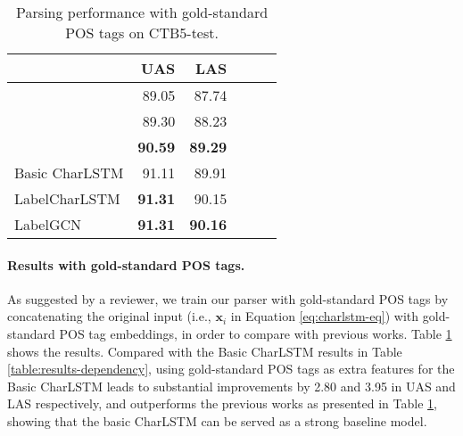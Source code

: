 \begin{table}[t]
\setlength{\tabcolsep}{2.5pt}
\centering
\begin{tabular}{lrrrrr}
    \toprule
    &  UAS & LAS \\
    \hline
   \citet{ma-2017-neural} &89.05 &87.74 \\
   \citet{dozat2016deep} &89.30 &88.23 \\
   \citet{acl18-ma-stackpointer} &\textbf{90.59}&\textbf{89.29}\\
    \hline
    Basic CharLSTM &91.11 &89.91  \\
    LabelCharLSTM    &\textbf{91.31} &90.15 \\
    LabelGCN       &\textbf{91.31}  &\textbf{90.16} \\
    \bottomrule
\end{tabular}
    \caption{Parsing performance with gold-standard POS tags on CTB5-test.}
    \label{table:results-dependency-goldpos}
\end{table}


\paragraph{Results with gold-standard POS tags.} As suggested by a reviewer, we train our parser with gold-standard POS tags by concatenating the original input (i.e., $\mathbf{x}_{i}$ in Equation \ref{eq:charlstm-eq}) with gold-standard POS tag embeddings, in order to compare with previous works. 
Table \ref{table:results-dependency-goldpos} shows the results. 
Compared with the Basic CharLSTM results in Table \ref{table:results-dependency}, using gold-standard POS tags as extra features for the Basic CharLSTM leads to substantial improvements by 2.80 and 3.95 in UAS and LAS respectively, and outperforms the previous works as presented in Table \ref{table:results-dependency-goldpos}, showing that the basic CharLSTM can be served as a strong baseline model.


